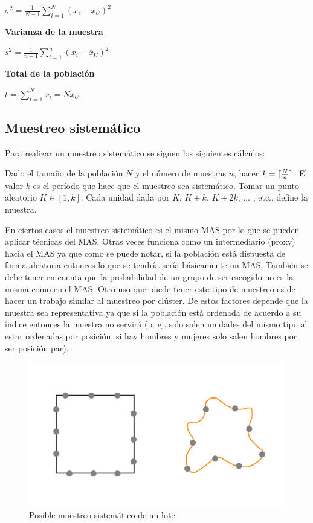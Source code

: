 \documentclass{report}
\DeclarePairedDelimiter{\ceil}{\lceil}{\rceil}
\begin{document}
\bigbreak

$\sigma ^2 = \frac{1}{N-1} \sum_{i=1}^{N} (x_i - \overline{x}_U)^2$


\bigbreak
\textbf{Varianza de la muestra}

\bigbreak

$s^2 = \frac{1}{n-1} \sum_{i=1}^n (x_i - \overline{x}_U)^2$


\bigbreak
\textbf{Total de la población}

\bigbreak

$t = \sum_{i=1}^N x_i = N \overline{x}_U$


\subsection{Muestreo sistemático}

Para realizar un muestreo sistemático se siguen los siguientes cálculos:

\bigbreak

Dado el tamaño de la población $N$ y el número de muestras $n$, hacer $k=\ceil{\frac{N}{n}}$. El valor $k$ es el período que hace que el muestreo sea sistemático. Tomar un punto aleatorio $K \in [1, k]$. Cada unidad dada por $K$, $K + k$, $K + 2k$, ... , etc., define la muestra.

\bigbreak

En ciertos casos el muestreo sistemático es el mismo MAS por lo que se pueden aplicar técnicas del MAS. Otras veces funciona como un intermediario (proxy) hacia el MAS ya que como se puede notar, si la población está dispuesta de forma aleatoria entonces lo que se tendría sería básicamente un MAS. También se debe tener en cuenta que la probabilidad de un grupo de ser escogido no es la misma como en el MAS. Otro uso que puede tener este tipo de muestreo es de hacer un trabajo similar al muestreo por clúster. De estos factores depende que la muestra sea representativa ya que si la población está ordenada de acuerdo a su índice entonces la muestra no servirá (p. ej. solo salen unidades del mismo tipo al estar ordenadas por posición, si hay hombres y mujeres solo salen hombres por ser posición par). 

\bigbreak

\begin{figure}[H]
    \centering
    \includegraphics[width=0.3\paperwidth]{img/soil-systematic-sampling.png}
    \caption{Posible muestreo sistemático de un lote}
\end{figure}
\end{document}
